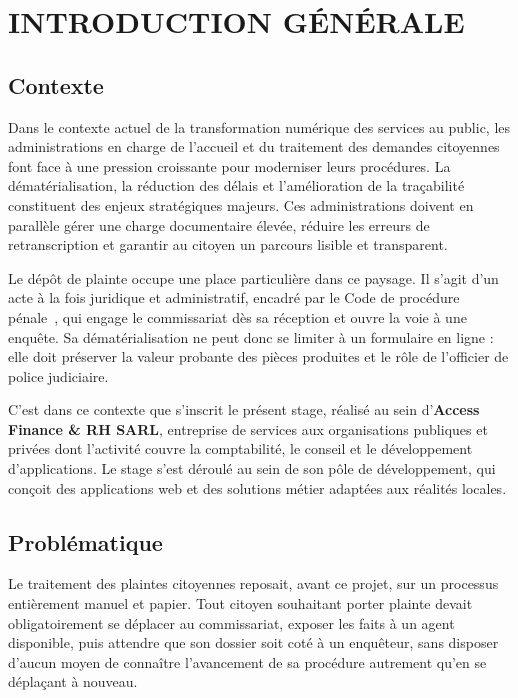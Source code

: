 
\chapter*{INTRODUCTION GÉNÉRALE}
\label{ch:introduction}

\section*{Contexte}

Dans le contexte actuel de la transformation numérique des services au public, les administrations en charge de l'accueil et du traitement des demandes citoyennes font face à une pression croissante pour moderniser leurs procédures. La dématérialisation, la réduction des délais et l'amélioration de la traçabilité constituent des enjeux stratégiques majeurs. Ces administrations doivent en parallèle gérer une charge documentaire élevée, réduire les erreurs de retranscription et garantir au citoyen un parcours lisible et transparent.

Le dépôt de plainte occupe une place particulière dans ce paysage. Il s'agit d'un acte à la fois juridique et administratif, encadré par le Code de procédure pénale~\cite{cameroun-cpp}, qui engage le commissariat dès sa réception et ouvre la voie à une enquête. Sa dématérialisation ne peut donc se limiter à un formulaire en ligne : elle doit préserver la valeur probante des pièces produites et le rôle de l'officier de police judiciaire.

C'est dans ce contexte que s'inscrit le présent stage, réalisé au sein d'\textbf{Access Finance \& RH SARL}, entreprise de services aux organisations publiques et privées dont l'activité couvre la comptabilité, le conseil et le développement d'applications. Le stage s'est déroulé au sein de son pôle de développement, qui conçoit des applications web et des solutions métier adaptées aux réalités locales.

\section*{Problématique}

Le traitement des plaintes citoyennes reposait, avant ce projet, sur un processus entièrement manuel et papier. Tout citoyen souhaitant porter plainte devait obligatoirement se déplacer au commissariat, exposer les faits à un agent disponible, puis attendre que son dossier soit coté à un enquêteur, sans disposer d'aucun moyen de connaître l'avancement de sa procédure autrement qu'en se déplaçant à nouveau.

